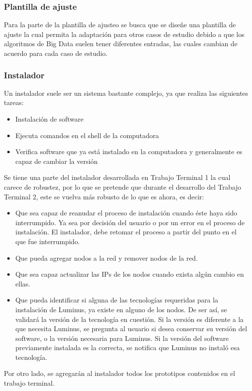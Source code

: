 \subsubsection{Plantilla de ajuste}
Para la parte de la plantilla de ajusteo se busca que se diseñe una plantilla de ajuste la cual permita la adaptación para otros casos de estudio debido a que los algoritmos de Big Data suelen tener diferentes entradas, las cuales cambian de acuerdo para cada caso de estudio.
\\
\subsubsection{Instalador}
Un instalador suele ser un sistema bastante complejo, ya que realiza las siguientes tareas:
\begin{itemize}
	\item Instalación de software
	\item Ejecuta comandos en el shell de la computadora
	\item Verifica software que ya está instalado en la computadora y generalmente es capaz de cambiar la versión
\end{itemize}
Se tiene una parte del instalador desarrollada en Trabajo Terminal 1 la cual carece de robustez, por lo que se pretende que durante el desarrollo del Trabajo Terminal 2, este se vuelva más robusto de lo que es ahora, es decir:
\begin{itemize}
	\item Que sea capaz de reanudar el proceso de instalación cuando éste haya sido interrumpido. Ya sea por decisión del usuario o por un error en el proceso de instalación. El instalador, debe retomar el proceso a partir del punto en el que fue interrumpido.
	\item Que pueda agregar nodos a la red y remover nodos de la red.
	\item Que sea capaz actualizar las IPs de los nodos cuando exista algún cambio en ellas.
	\item Que pueda identificar si alguna de las tecnologías requeridas para la instalación de Luminus, ya existe en alguno de los nodos. De ser así, se validará la versión de la tecnología en cuestión. Si la versión es diferente a la que necesita Luminus, se pregunta al usuario si desea conservar su versión del software, o la versión necesaria para Luminus. Si la versión del software previamente instalada es la correcta, se notifica que Luminus no instaló esa tecnología.
\end{itemize}
Por otro lado, se agregarán al instalador todos los prototipos contenidos en el trabajo terminal.
